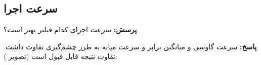 \documentclass[12pt,a4paper]{article}
\theoremstyle{definition}
\theoremstyle{theorem}
\theoremstyle{definition}
\begin{document}
\begin{center}
\vspace{0.5cm}
\end{center} 


\subsection{سرعت اجرا}
\textbf{پرسش:}
سرعت اجرای کدام فیلتر بهتر است؟

\textbf{پاسخ:}
سرعت گاوسی و میانگین برابر و سرعت میانه به طرز چشم‌گیری تفاوت داشت. تفاوت نتیجه قابل قبول است (تصویر
):
\end{document}
